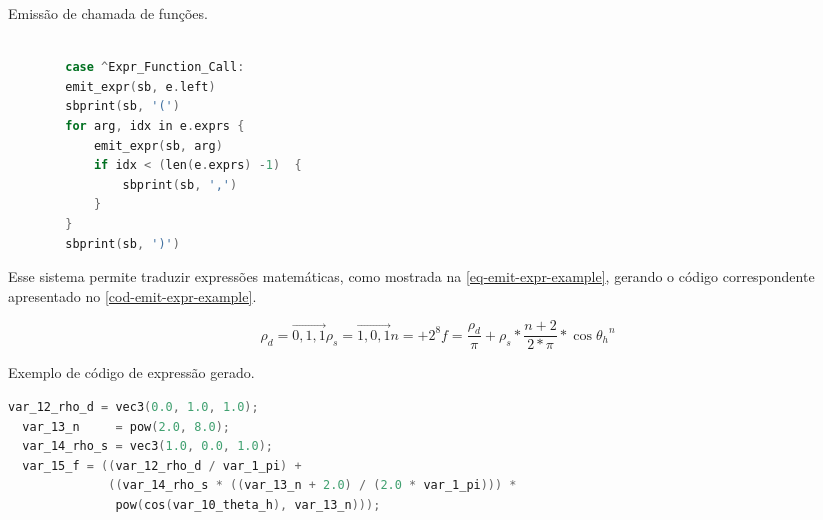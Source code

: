 \begin{codigo}[H]
    \caption{\small Emissão de chamada de funções. }
    \label{cod-emission-func}
\begin{lstlisting}[language=C, frame=none, inputencoding=utf8]

        case ^Expr_Function_Call:
        emit_expr(sb, e.left)
        sbprint(sb, '(')
        for arg, idx in e.exprs {
            emit_expr(sb, arg)
            if idx < (len(e.exprs) -1)  {
                sbprint(sb, ',')
            }
        }
        sbprint(sb, ')')
\end{lstlisting}
\end{codigo}


 Esse sistema permite traduzir expressões matemáticas, como mostrada na \autoref{eq-emit-expr-example}, gerando o código correspondente apresentado no \autoref{cod-emit-expr-example}.

\begin{subequations} \label{eq-emit-expr-example}
\begin{equation}
    \rho_{d} = \vec{0,1,1}
\end{equation}
\begin{equation}
    \rho_{s} = \vec{1,0,1}
\end{equation}
\begin{equation}
    n = +2^8
\end{equation}
\begin{equation}
f = \frac{\rho_{d}}{\pi} + \rho_{s} * \frac{n+2}{2*\pi} *
\cos{\theta_{h}}^{n}
\end{equation}
\end{subequations}

\begin{codigo}[H]
   \caption{\small Exemplo de código de expressão gerado. }
   \label{cod-emit-expr-example}
\begin{lstlisting}[language=C, basicstyle=\ttfamily\footnotesize, frame=none, inputencoding=utf8]
  var_12_rho_d = vec3(0.0, 1.0, 1.0);
  var_13_n     = pow(2.0, 8.0);
  var_14_rho_s = vec3(1.0, 0.0, 1.0);
  var_15_f = ((var_12_rho_d / var_1_pi) +
              ((var_14_rho_s * ((var_13_n + 2.0) / (2.0 * var_1_pi))) *
               pow(cos(var_10_theta_h), var_13_n)));
\end{lstlisting}
\end{codigo}

